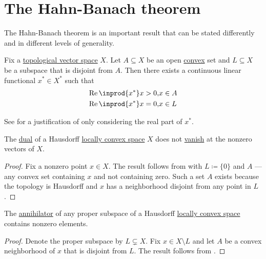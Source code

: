 \section{The Hahn-Banach theorem}\label{sec:hahn_banach}

The Hahn-Banach theorem is an important result that can be stated differently and in different levels of generality.

\begin{theorem}\label{thm:geometric_hahn_banach}
  Fix a \hyperref[def:topological_vector_space]{topological vector space} \( X \). Let \( A \subseteq X \) be an open \hyperref[def:convex_hull]{convex} set and \( L \subseteq X \) be a subspace that is disjoint from \( A \). Then there exists a continuous linear functional \( x^* \in X^* \) such that
  \begin{equation*}
    \begin{aligned}
      \real \inprod{x^*} x > 0, &x \in A \\
      \real \inprod{x^*} x = 0, &x \in L
    \end{aligned}
  \end{equation*}

  See  for a justification of only considering the real part of \( x^* \).
\end{theorem}

\begin{corollary}\label{thm:hahn_banach_implies_functionals_vanish_nowhere}
  The \hyperref[def:dual_vector_space]{dual} of a Hausdorff \hyperref[def:locally_convex_space]{locally convex space} \( X \) does not \hyperref[def:functions_vanish_nowhere]{vanish} at the nonzero vectors of \( X \).
\end{corollary}
\begin{proof}
  Fix a nonzero point \( x \in X \). The result follows from  with \( L \coloneqq \{ 0 \} \) and \( A \) --- any convex set containing \( x \) and not containing zero. Such a set \( A \) exists because the topology is Hausdorff and \( x \) has a neighborhood disjoint from any point in \( L \).
\end{proof}

\begin{corollary}\label{thm:hahn_banach_implies_annihilator_nontrivial}
  The \hyperref[def:vector_space_annihilator]{annihilator} of any proper subspace of a Hausdorff \hyperref[def:locally_convex_space]{locally convex space} contains nonzero elements.
\end{corollary}
\begin{proof}
  Denote the proper subspace by \( L \subsetneq X \). Fix \( x \in X \setminus L \) and let \( A \) be a convex neighborhood of \( x \) that is disjoint from \( L \). The result follows from .
\end{proof}

